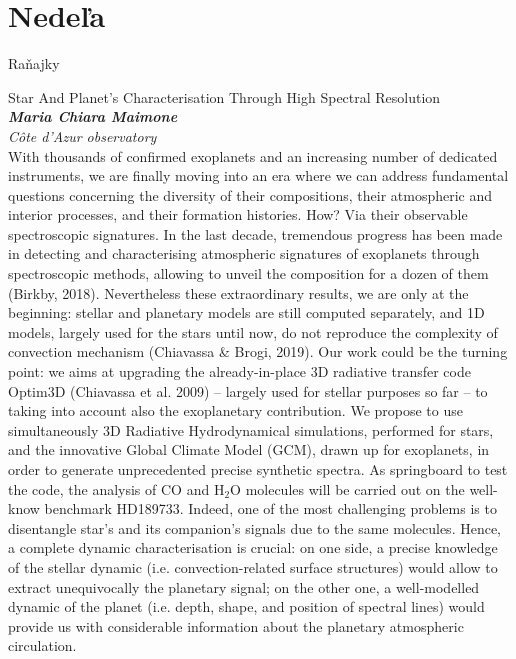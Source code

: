 \documentclass[a4paper]{report}
\begin{document}
                    \section{Nedeľa}


                    \begin{tcolorbox}[
                                    colback=red!10,
                    colframe=red!50!black,
                                fonttitle=\Large\bfseries,
                title=09:00
            ]
                {\Large Raňajky}
                                                            \end{tcolorbox}
                    \begin{tcolorbox}[
                                    colback=white,
                    colframe=black!70!white,
                                fonttitle=\Large\bfseries,
                title=10:00
            ]
                {\Large Star And Planet’s Characterisation Through High Spectral Resolution}
                                                            \\ \textbf{\textit{Maria Chiara Maimone}}
                                                    \\ \textit{Côte d’Azur observatory}                \\[2ex]With thousands of confirmed exoplanets and an increasing number of dedicated instruments, we are finally moving into an era where we can address fundamental questions concerning the diversity of their compositions, their atmospheric and interior processes, and their formation histories. How? Via their observable spectroscopic signatures. In the last decade, tremendous progress has been made in detecting and characterising atmospheric signatures of exoplanets through spectroscopic methods, allowing to unveil the composition for a dozen of them (Birkby, 2018).
Nevertheless these extraordinary results, we are only at the beginning: stellar and planetary models are still computed separately, and 1D models, largely used for the stars until now, do not reproduce the complexity of convection mechanism (Chiavassa \& Brogi, 2019). Our work could be the turning point: we aims at upgrading the already-in-place 3D radiative transfer code Optim3D (Chiavassa et al. 2009) -- largely used for stellar purposes so far -- to taking into account also the exoplanetary contribution. We propose to use simultaneously 3D Radiative Hydrodynamical simulations, performed for stars, and the innovative Global Climate Model (GCM), drawn up for exoplanets, in order to generate unprecedented precise synthetic spectra. As springboard to test the code, the analysis of CO and $\mathrm{H}_2\mathrm{O}$ molecules will be carried out on the well-know benchmark HD189733. Indeed, one of the most challenging problems is to disentangle star’s and its companion’s signals due to the same molecules. Hence, a complete dynamic characterisation is crucial: on one side, a precise knowledge of the stellar dynamic (i.e. convection-related surface structures) would allow to extract unequivocally the planetary signal; on the other one, a well-modelled dynamic of the planet (i.e. depth, shape, and position of spectral lines) would provide us with considerable information about the planetary atmospheric circulation.

\end{tcolorbox}
\end{document}
